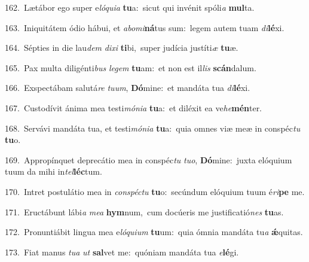 {\numbfont\textcolor{\numbcolor}{162.}}~Lætábor ego super e\-\textit{ló}\-\textit{qui}\textit{a} \textbf{tu}\-a:~\star sicut qui invénit spóli\textit{a} \textbf{mul}\-ta.\par
{\numbfont\textcolor{\numbcolor}{163.}}~Iniquitátem ódio hábui, et \textit{ab}\-\textit{o}\textit{mi}\textbf{ná}tus sum:~\star legem autem tuam \textit{di}\-\textbf{lé}xi.\par
{\numbfont\textcolor{\numbcolor}{164.}}~Sépties in die lau\textit{dem} \textit{di}\-\textit{xi} \textbf{ti}\-bi,~\star super judícia justíti\textit{æ} \textbf{tu}\-æ.\par
{\numbfont\textcolor{\numbcolor}{165.}}~Pax multa diligénti\textit{bus} \textit{le}\-\textit{gem} \textbf{tu}\-am:~\star et non est il\textit{lis} \textbf{scán}\-dalum.\par
{\numbfont\textcolor{\numbcolor}{166.}}~Exspectábam salutá\textit{re} \textit{tu}\-\textit{um}, \textbf{Dó}\-mine:~\star et mandáta tua \textit{di}\-\textbf{lé}xi.\par
{\numbfont\textcolor{\numbcolor}{167.}}~Custodívit ánima mea testi\-\textit{mó}\-\textit{ni}\textit{a} \textbf{tu}\-a:~\star et diléxit ea ve\-\textit{he}\-\textbf{mén}ter.\par
{\numbfont\textcolor{\numbcolor}{168.}}~Servávi mandáta tua, et testi\-\textit{mó}\-\textit{ni}\textit{a} \textbf{tu}\-a:~\star quia omnes viæ meæ in conspéc\textit{tu} \textbf{tu}\-o.\par
{\numbfont\textcolor{\numbcolor}{169.}}~Appropínquet deprecátio mea in conspéc\textit{tu} \textit{tu}\-\textit{o}, \textbf{Dó}\-mine:~\star juxta elóquium tuum da mihi in\-\textit{tel}\-\textbf{léc}tum.\par
{\numbfont\textcolor{\numbcolor}{170.}}~Intret postulátio mea in \textit{con}\-\textit{spéc}\textit{tu} \textbf{tu}\-o:~\star secúndum elóquium tuum é\-\textit{ri}\-\textbf{pe} me.\par
{\numbfont\textcolor{\numbcolor}{171.}}~Eructábunt lábi\textit{a} \textit{me}\-\textit{a} \textbf{hym}\-num,~\star cum docúeris me justificatió\textit{nes} \textbf{tu}\-as.\par
{\numbfont\textcolor{\numbcolor}{172.}}~Pronuntiábit lingua mea e\-\textit{ló}\-\textit{qui}\textit{um} \textbf{tu}\-um:~\star quia ómnia mandáta tu\textit{a} \textbf{ǽ}\-quitas.\par
{\numbfont\textcolor{\numbcolor}{173.}}~Fiat manus \textit{tu}\-\textit{a} \textit{ut} \textbf{sal}\-vet me:~\star quóniam mandáta tua \textit{e}\-\textbf{lé}gi.\par
